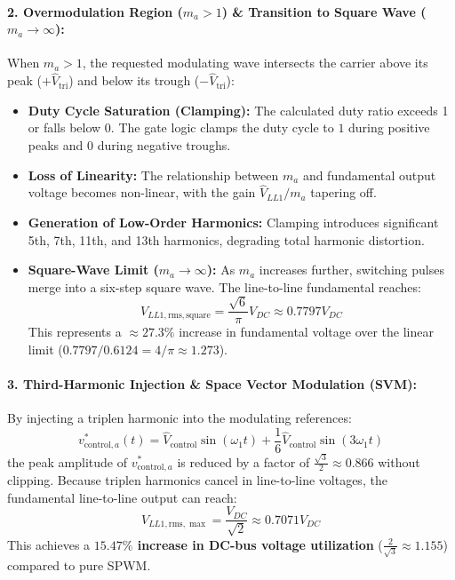 \paragraph{2. Overmodulation Region ($m_a > 1$) \& Transition to Square Wave ($m_a \to \infty$):}
When $m_a > 1$, the requested modulating wave intersects the carrier above its peak ($+\hat{V}_{\mathrm{tri}}$) and below its trough ($-\hat{V}_{\mathrm{tri}}$):
\begin{itemize}
  \item \textbf{Duty Cycle Saturation (Clamping):} The calculated duty ratio exceeds 1 or falls below 0. The gate logic clamps the duty cycle to $1$ during positive peaks and $0$ during negative troughs.
  \item \textbf{Loss of Linearity:} The relationship between $m_a$ and fundamental output voltage becomes non-linear, with the gain $\hat{V}_{LL1} / m_a$ tapering off.
  \item \textbf{Generation of Low-Order Harmonics:} Clamping introduces significant 5th, 7th, 11th, and 13th harmonics, degrading total harmonic distortion.
  \item \textbf{Square-Wave Limit ($m_a \to \infty$):} As $m_a$ increases further, switching pulses merge into a six-step square wave. The line-to-line fundamental reaches:
  \begin{equation}
  V_{LL1,\mathrm{rms},\mathrm{square}} = \frac{\sqrt{6}}{\pi} V_{DC} \approx 0.7797 V_{DC}
  \end{equation}
  This represents a $\approx 27.3\%$ increase in fundamental voltage over the linear limit ($0.7797 / 0.6124 = 4/\pi \approx 1.273$).
\end{itemize}

\paragraph{3. Third-Harmonic Injection \& Space Vector Modulation (SVM):}
By injecting a triplen harmonic into the modulating references:
\begin{equation}
v_{\mathrm{control},a}^*(t) = \hat{V}_{\mathrm{control}} \sin(\omega_1 t) + \frac{1}{6}\hat{V}_{\mathrm{control}} \sin(3\omega_1 t)
\end{equation}
the peak amplitude of $v_{\mathrm{control},a}^*$ is reduced by a factor of $\frac{\sqrt{3}}{2} \approx 0.866$ without clipping. Because triplen harmonics cancel in line-to-line voltages, the fundamental line-to-line output can reach:
\begin{equation}
V_{LL1,\mathrm{rms},\max} = \frac{V_{DC}}{\sqrt{2}} \approx 0.7071 V_{DC}
\end{equation}
This achieves a \textbf{$15.47\%$ increase in DC-bus voltage utilization} ($\frac{2}{\sqrt{3}} \approx 1.155$) compared to pure SPWM.

